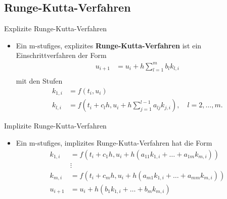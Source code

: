 \subsection{Runge-Kutta-Verfahren}

\begin{frame}{Explizite Runge-Kutta-Verfahren}
    \begin{itemize}
        \item<1-> Ein m-stufiges, explizites \textbf{Runge-Kutta-Verfahren} ist ein Einschrittverfahren der Form
        \begin{align*}
            u_{i+1}&=u_i+h\sum_{l=1}^{m}b_{l}k_{l,i}\\
        \end{align*}
        mit den Stufen
        \begin{align*}
            k_{1,i} &= f(t_i,u_i)\\
            k_{l,i} &= f(t_i+c_lh, u_i + h\sum_{j=1}^{l-1}a_{lj}k_{j,i} ), \quad l=2,\dots,m.
        \end{align*}
    \end{itemize}
\end{frame}

\begin{frame}{Implizite Runge-Kutta-Verfahren}
    \begin{itemize}
        \item<1-> Ein m-stufiges, implizites Runge-Kutta-Verfahren hat die Form
        \begin{align*}
            k_{1,i} &= f(t_i+c_1h, u_i + h(a_{11}k_{1,i} + \dots + a_{1m} k_{m,i})) \\
            &\vdots\\
            k_{m,i} &= f(t_i+c_mh, u_i + h(a_{m1}k_{1,i} + \dots + a_{mm} k_{m,i}))\\
            u_{i+1} &= u_i + h(b_1 k_{1,i} + \dots + b_m k_{m,i})
        \end{align*}
    \end{itemize}
\end{frame}

